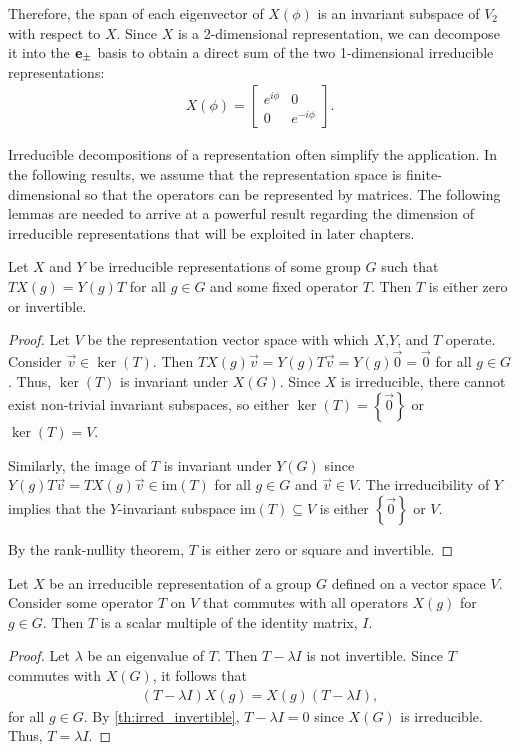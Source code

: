 \begin{example}
    Therefore, the span of each eigenvector of $X(\phi)$ is an invariant subspace of $V_2$ with respect to $X$. Since $X$ is a 2-dimensional representation, we can decompose it into the $\mathbf{e}_\pm$ basis to obtain a direct sum of the two 1-dimensional irreducible representations:
    \begin{align*}
        X(\phi) = \begin{bmatrix}
            e^{i\phi} & 0\\
            0 & e^{-i\phi}
        \end{bmatrix}.
    \end{align*}
\end{example}

Irreducible decompositions of a representation often simplify the application. In the following results, we assume that the representation space is finite-dimensional so that the operators can be represented by matrices. The following lemmas are needed to arrive at a powerful result regarding the dimension of irreducible representations that will be exploited in later chapters.

\begin{lemma}\label{th:irred_invertible}
    Let $X$ and $Y$ be irreducible representations of some group $G$ such that $TX(g)=Y(g)T$ for all $g\in G$ and some fixed operator $T$. Then $T$ is either zero or invertible.
\end{lemma}
\begin{proof}
    Let $V$ be the representation vector space with which $X$,$Y$, and $T$ operate. Consider $\vec{v}\in\ker(T)$. Then $TX(g)\vec{v} = Y(g)T\vec{v} = Y(g)\vec{0}=\vec{0}$ for all $g\in G$. Thus, $\ker(T)$ is invariant under $X(G)$. Since $X$ is irreducible, there cannot exist non-trivial invariant subspaces, so either $\ker(T) = \left\{ \vec{0} \right\}$ or $\ker(T) = V$.

    Similarly, the image of $T$ is invariant under $Y(G)$ since $Y(g)T\vec{v} = TX(g)\vec{v}\in\textrm{im}(T)$ for all $g\in G$ and $\vec{v}\in V$. The irreducibility of $Y$ implies that the $Y$-invariant subspace $\textrm{im}(T)\subseteq V$ is either $\left\{ \vec{0} \right\}$ or $V$.

    By the rank-nullity theorem, $T$ is either zero or square and invertible.
\end{proof}

\begin{lemma}\label{th:schur}
    Let $X$ be an irreducible representation of a group $G$ defined on a vector space $V$. Consider some operator $T$ on $V$ that commutes with all operators $X(g)$ for $g\in G$. Then $T$ is a scalar multiple of the identity matrix, $I$.
\end{lemma}
\begin{proof}
    Let $\lambda$ be an eigenvalue of $T$. Then $T-\lambda I$ is not invertible. Since $T$ commutes with $X(G)$, it follows that
    \begin{align*}
        (T-\lambda I)X(g)=X(g)(T-\lambda I),
    \end{align*}
    for all $g\in G$. By \cref{th:irred_invertible}, $T-\lambda I = 0$ since $X(G)$ is irreducible. Thus, $T=\lambda I$.
\end{proof}

